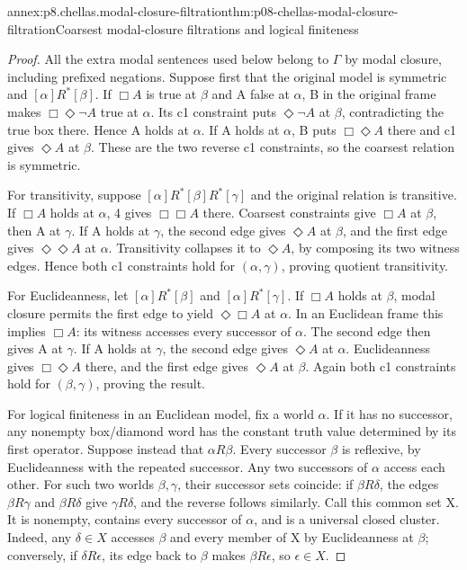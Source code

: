 \begin{annexitem}{annex:p8.chellas.modal-closure-filtration}{thm:p08-chellas-modal-closure-filtration}{Coarsest modal-closure filtrations and logical finiteness}
\begin{proof}
All the extra modal sentences used below belong to \(\Gamma\)
by modal closure, including prefixed negations. Suppose first that
the original model is symmetric and \([\alpha]R^*[\beta]\).
If \(\Box A\) is true at \(\beta\) and A false at \(\alpha\),
B in the original frame makes \(\Box\Diamond\neg A\) true
at \(\alpha\). Its c1 constraint puts \(\Diamond\neg A\)
at \(\beta\), contradicting the true box there. Hence A holds
at \(\alpha\). If A holds at \(\alpha\), B puts
\(\Box\Diamond A\) there and c1 gives \(\Diamond A\)
at \(\beta\). These are the two reverse c1 constraints,
so the coarsest relation is symmetric.

For transitivity, suppose \([\alpha]R^*[\beta]R^*[\gamma]\)
and the original relation is transitive. If \(\Box A\) holds
at \(\alpha\), 4 gives \(\Box\Box A\) there. Coarsest
constraints give \(\Box A\) at \(\beta\), then A at
\(\gamma\). If A holds at \(\gamma\), the second edge
gives \(\Diamond A\) at \(\beta\), and the first edge
gives \(\Diamond\Diamond A\) at \(\alpha\).
Transitivity collapses it to \(\Diamond A\), by composing
its two witness edges. Hence both c1 constraints hold for
\((\alpha,\gamma)\), proving quotient transitivity.

For Euclideanness, let \([\alpha]R^*[\beta]\) and
\([\alpha]R^*[\gamma]\). If \(\Box A\) holds at
\(\beta\), modal closure permits the first edge to yield
\(\Diamond\Box A\) at \(\alpha\). In an Euclidean frame
this implies \(\Box A\): its witness accesses every successor
of \(\alpha\). The second edge then gives A at \(\gamma\).
If A holds at \(\gamma\), the second edge gives
\(\Diamond A\) at \(\alpha\). Euclideanness gives
\(\Box\Diamond A\) there, and the first edge gives
\(\Diamond A\) at \(\beta\). Again both c1 constraints
hold for \((\beta,\gamma)\), proving the result.

For logical finiteness in an Euclidean model, fix a world \(\alpha\).
If it has no successor, any nonempty box/diamond word has the constant
truth value determined by its first operator. Suppose instead that
\(\alpha R\beta\). Every successor \(\beta\) is reflexive,
by Euclideanness with the repeated successor. Any two successors
of \(\alpha\) access each other. For such two worlds
\(\beta,\gamma\), their successor sets coincide: if
\(\beta R\delta\), the edges \(\beta R\gamma\) and
\(\beta R\delta\) give \(\gamma R\delta\), and the
reverse follows similarly. Call this common set X. It is nonempty,
contains every successor of \(\alpha\), and is a universal
closed cluster. Indeed, any \(\delta\in X\) accesses
\(\beta\) and every member of X by Euclideanness at
\(\beta\); conversely, if \(\delta R\epsilon\), its edge
back to \(\beta\) makes \(\beta R\epsilon\), so
\(\epsilon\in X\).


\end{proof}
\end{annexitem}
